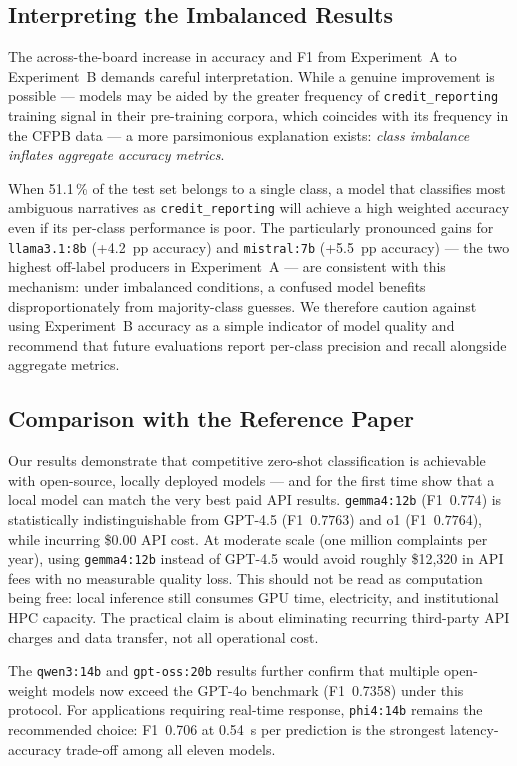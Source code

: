 \documentclass[journal]{IEEEtran}
\begin{document}
\subsection{Interpreting the Imbalanced Results}

The across-the-board increase in accuracy and F1 from Experiment~A
to Experiment~B demands careful interpretation. While a genuine
improvement is possible — models may be aided by the greater
frequency of \texttt{credit\_reporting} training signal in
their pre-training corpora, which coincides with its frequency in
the CFPB data — a more parsimonious explanation exists:
\emph{class imbalance inflates aggregate accuracy metrics}.

When 51.1\,\% of the test set belongs to a single class, a model
that classifies most ambiguous narratives as \texttt{credit\_reporting}
will achieve a high weighted accuracy even if its per-class performance
is poor. The particularly pronounced gains for \texttt{llama3.1:8b}
(+4.2~pp accuracy) and \texttt{mistral:7b} (+5.5~pp accuracy) — the
two highest off-label producers in Experiment~A — are consistent
with this mechanism: under imbalanced conditions, a confused model
benefits disproportionately from majority-class guesses. We therefore
caution against using Experiment~B accuracy as a simple indicator of
model quality and recommend that future evaluations report per-class
precision and recall alongside aggregate metrics.

\subsection{Comparison with the Reference Paper}

Our results demonstrate that competitive zero-shot classification is
achievable with open-source, locally deployed models — and for the
first time show that a local model can match the very best paid
API results. \texttt{gemma4:12b} (F1~$0.774$) is statistically
indistinguishable from GPT-4.5 (F1~$0.7763$) and o1 (F1~$0.7764$),
while incurring \$0.00 API cost. At moderate scale (one million
complaints per year), using \texttt{gemma4:12b} instead of GPT-4.5
would avoid roughly \$12,320 in API fees with no measurable quality
loss. This should not be read as computation being free: local
inference still consumes GPU time, electricity, and institutional HPC
capacity. The practical claim is about eliminating recurring third-party
API charges and data transfer, not all operational cost.

The \texttt{qwen3:14b} and \texttt{gpt-oss:20b} results further confirm
that multiple open-weight models now exceed the GPT-4o benchmark
(F1~0.7358) under this protocol. For applications requiring real-time
response, \texttt{phi4:14b} remains the recommended choice: F1~0.706
at 0.54~s per prediction is the strongest latency-accuracy trade-off
among all eleven models.
\end{document}

